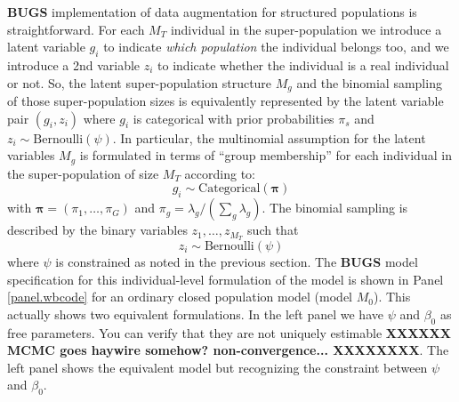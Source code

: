 {\bf BUGS} implementation of data augmentation for structured
populations is straightforward. 
For each $M_{T}$ individual in the
super-population we introduce a latent variable $g_{i}$ to indicate
{\it which population} the individual belongs too, and we introduce a 2nd
variable $z_{i}$ to indicate whether the individual is a real
individual or not.  So, the latent super-population structure $M_{g}$
and the binomial sampling of those super-population sizes is
equivalently represented by the latent variable pair $(g_{i},z_{i})$
where $g_{i}$ is categorical with prior probabilities $\pi_{s}$ and
$z_{i} \sim \mbox{Bernoulli}(\psi)$.  In particular, the multinomial assumption
for the latent variables $M_{g}$ is formulated in terms of ``group
membership'' for each individual in the super-population of size $M_{T}$
according to:
\[
 g_{i} \sim \mbox{Categorical}\left( {\bm \pi} \right)
\]
with ${\bm \pi} = (\pi_{1}, \ldots, \pi_{G})$ and $\pi_{g} =
\lambda_{g}/(\sum_{g} \lambda_{g})$.  The binomial sampling is
described by the binary variables $z_{1},\ldots,z_{M_{T}}$ such that
\[
 z_{i} \sim \mbox{Bernoulli}(\psi)
\]
where $\psi$ is constrained as noted in the previous section.  
The {\bf BUGS} model specification for this individual-level
formulation of the model 
is shown in Panel \ref{panel.wbcode}
for an ordinary closed population model (model $M_{0}$).
This actually shows two equivalent formulations. In the left panel we
have $\psi$ and $\beta_{0}$ as free parameters. You can verify that
they are not uniquely estimable {\bf XXXXXX MCMC goes haywire somehow?
  non-convergence... XXXXXXXX}. The left panel shows the equivalent
model but recognizing the constraint between $\psi$ and $\beta_{0}$. 

